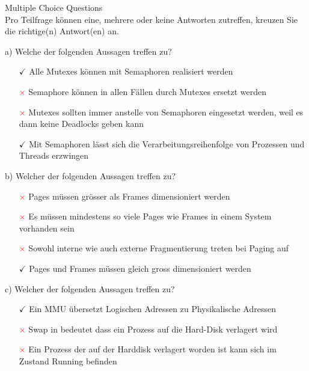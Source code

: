 \begin{example2}{Multiple Choice Questions}\\
    Pro Teilfrage können eine, mehrere oder keine Antworten zutreffen, kreuzen Sie die richtige(n) Antwort(en) an.
    
    a) Welche der folgenden Aussagen treffen zu?
    \begin{itemize}
        \item[\textcolor{frog}{$\checkmark$}] Alle Mutexes können mit Semaphoren realisiert werden
        \item[\textcolor{red}{$\times$}] Semaphore können in allen Fällen durch Mutexes ersetzt werden  
        \item[\textcolor{red}{$\times$}] Mutexes sollten immer anstelle von Semaphoren eingesetzt werden, weil es dann keine Deadlocks geben kann
        \item[\textcolor{frog}{$\checkmark$}] Mit Semaphoren lässt sich die Verarbeitungsreihenfolge von Prozessen und Threads erzwingen
    \end{itemize}
    
    b) Welcher der folgenden Aussagen treffen zu?
    \begin{itemize}
        \item[\textcolor{red}{$\times$}] Pages müssen grösser als Frames dimensioniert werden
        \item[\textcolor{red}{$\times$}] Es müssen mindestens so viele Pages wie Frames in einem System vorhanden sein
        \item[\textcolor{red}{$\times$}] Sowohl interne wie auch externe Fragmentierung treten bei Paging auf
        \item[\textcolor{frog}{$\checkmark$}] Pages und Frames müssen gleich gross dimensioniert werden
    \end{itemize}
    
    c) Welcher der folgenden Aussagen treffen zu?
    \begin{itemize}
        \item[\textcolor{frog}{$\checkmark$}] Ein MMU übersetzt Logischen Adressen zu Physikalische Adressen
        \item[\textcolor{red}{$\times$}] Swap in bedeutet dass ein Prozess auf die Hard-Disk verlagert wird
        \item[\textcolor{red}{$\times$}] Ein Prozess der auf der Harddisk verlagert worden ist kann sich im Zustand Running befinden
    \end{itemize}
    

\end{example2}
